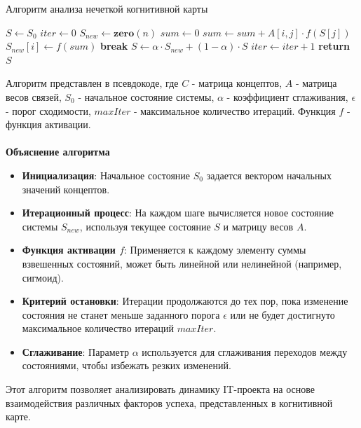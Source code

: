 \documentclass{article}
\begin{document}
    \begin{algorithm}
        \caption{Алгоритм анализа нечеткой когнитивной карты}
        \begin{algorithmic}[1]
                \State $S \gets S_0$
                \State $iter \gets 0$
                    \State $S_{new} \gets \textbf{zero}(n)$
                        \State $sum \gets 0$
                            \State $sum \gets sum + A[i, j] \cdot f(S[j])$
                        \EndFor
                        \State $S_{new}[i] \gets f(sum)$
                    \EndFor
                        \State \textbf{break}
                    \EndIf
                    \State $S \gets \alpha \cdot S_{new} + (1 - \alpha) \cdot S$
                    \State $iter \gets iter + 1$
                \EndWhile
                \State \textbf{return} $S$
            \EndProcedure
        \end{algorithmic}
    \end{algorithm}
    Алгоритм представлен в псевдокоде, где $C$ - матрица концептов, $A$ - матрица весов связей, $S_0$ - начальное состояние системы, $\alpha$ - коэффициент сглаживания, $\epsilon$ - порог сходимости, $maxIter$ - максимальное количество итераций. Функция $f$ - функция активации.\\
    ~\\
    \textbf{Объяснение алгоритма}
    \begin{itemize}
    \item \textbf{Инициализация}: Начальное состояние $S_0$ задается вектором начальных значений концептов.
    \item \textbf{Итерационный процесс}: На каждом шаге вычисляется новое состояние системы $S_{new}$, используя текущее состояние $S$ и матрицу весов $A$.
    \item \textbf{Функция активации $f$}: Применяется к каждому элементу суммы взвешенных состояний, может быть линейной или нелинейной (например, сигмоид).
    \item \textbf{Критерий остановки}: Итерации продолжаются до тех пор, пока изменение состояния не станет меньше заданного порога $\epsilon$ или не будет достигнуто максимальное количество итераций $maxIter$.
    \item \textbf{Сглаживание}: Параметр $\alpha$ используется для сглаживания переходов между состояниями, чтобы избежать резких изменений.
    \end{itemize}
    Этот алгоритм позволяет анализировать динамику IT-проекта на основе взаимодействия различных факторов успеха, представленных в когнитивной карте.
\end{document}
